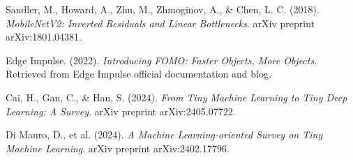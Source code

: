 \documentclass{article}
\begin{document}
\begin{thebibliography}{9}

Sandler, M., Howard, A., Zhu, M., Zhmoginov, A., & Chen, L. C. (2018).
\textit{MobileNetV2: Inverted Residuals and Linear Bottlenecks}.
arXiv preprint arXiv:1801.04381.

Edge Impulse. (2022).
\textit{Introducing FOMO: Faster Objects, More Objects}.
Retrieved from Edge Impulse official documentation and blog.

Cai, H., Gan, C., & Han, S. (2024).
\textit{From Tiny Machine Learning to Tiny Deep Learning: A Survey}.
arXiv preprint arXiv:2405.07722.

Di Mauro, D., et al. (2024).
\textit{A Machine Learning-oriented Survey on Tiny Machine Learning}.
arXiv preprint arXiv:2402.17796.

\end{thebibliography}
\end{document}
